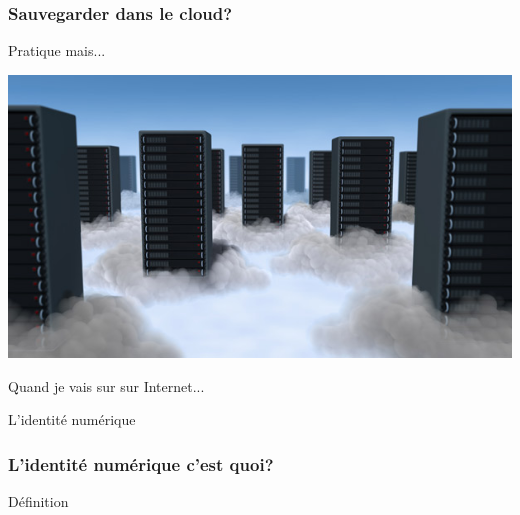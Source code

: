 \documentclass{beamer}
\begin{document}
\begin{frame}
\frametitle{Sauvegarder dans le cloud?}

\begin{block}{Pratique mais...}
\begin{itemize}
\end{itemize}
\end{block}

\begin{center}
\includegraphics[scale=0.4] {./images/cloud_data_center.jpg}
\end{center}

\end{frame}

\begin{frame}
\begin{center}
\Huge{Quand je vais sur sur Internet...}
\end{center}
\end{frame}

\begin{frame}
\begin{center}
\Huge{L'identité numérique}
\end{center}
\end{frame}


\begin{frame}
\frametitle{L'identité numérique c'est quoi?}


\begin{block}{Définition}
\begin{itemize}
\end{itemize}
\end{block}

\end{frame}
\end{document}
